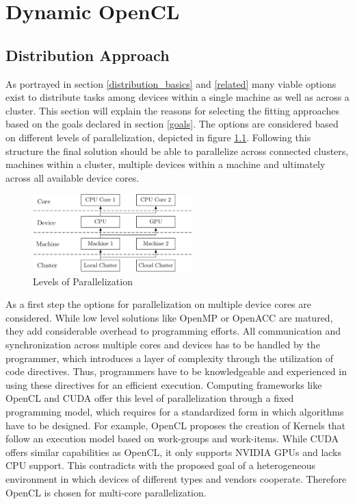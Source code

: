 \chapter{Dynamic OpenCL}

\section{Distribution Approach}
\label{distribution}
As portrayed in section \ref{distribution_basics} and \ref{related} many viable options exist to distribute tasks among devices within a single machine as well as across a cluster. This section will explain the reasons for selecting the fitting approaches based on the goals declared in section \ref{goals}. The options are considered based on different levels of parallelization, depicted in figure \ref{img:parallelization_levels}. Following this structure the final solution should be able to parallelize across connected clusters, machines within a cluster, multiple devices within a machine and ultimately across all available device cores.

\begin{figure}[H]	
	\includegraphics[width=0.55\textwidth]{drawings/parallelization_struct.pdf}
	\centering
	\caption{Levels of Parallelization}
	\label{img:parallelization_levels}
\end{figure}

As a first step the options for parallelization on multiple device cores are considered. While low level solutions like OpenMP or OpenACC are matured, they add considerable overhead to programming efforts. All communication and synchronization across multiple cores and devices has to be handled by the programmer, which introduces a layer of complexity through the utilization of code directives. Thus, programmers have to be knowledgeable and experienced in using these directives for an efficient execution. Computing frameworks like OpenCL and CUDA offer this level of parallelization through a fixed programming model, which requires for a standardized form in which algorithms have to be designed. For example, OpenCL proposes the creation of Kernels that follow an execution model based on work-groups and work-items. While CUDA offers similar capabilities as OpenCL, it only supports NVIDIA GPUs and lacks CPU support. This contradicts with the proposed goal of a heterogeneous environment in which devices of different types and vendors cooperate. Therefore OpenCL is chosen for multi-core parallelization.

